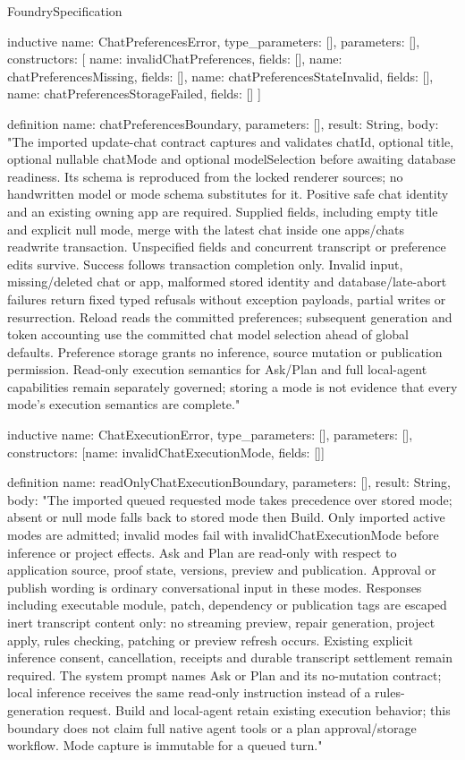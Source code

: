 \begin{lexlean}{FoundrySpecification}
\begin{semanticmodule}
inductive{
  name: ChatPreferencesError,
  type_parameters: [],
  parameters: [],
  constructors: [
    {name: invalidChatPreferences, fields: []},
    {name: chatPreferencesMissing, fields: []},
    {name: chatPreferencesStateInvalid, fields: []},
    {name: chatPreferencesStorageFailed, fields: []}
  ]
}

definition{
  name: chatPreferencesBoundary,
  parameters: [],
  result: String,
  body: "The imported update-chat contract captures and validates chatId, optional title, optional nullable chatMode and optional modelSelection before awaiting database readiness. Its schema is reproduced from the locked renderer sources; no handwritten model or mode schema substitutes for it. Positive safe chat identity and an existing owning app are required. Supplied fields, including empty title and explicit null mode, merge with the latest chat inside one apps/chats readwrite transaction. Unspecified fields and concurrent transcript or preference edits survive. Success follows transaction completion only. Invalid input, missing/deleted chat or app, malformed stored identity and database/late-abort failures return fixed typed refusals without exception payloads, partial writes or resurrection. Reload reads the committed preferences; subsequent generation and token accounting use the committed chat model selection ahead of global defaults. Preference storage grants no inference, source mutation or publication permission. Read-only execution semantics for Ask/Plan and full local-agent capabilities remain separately governed; storing a mode is not evidence that every mode's execution semantics are complete."
}

inductive{
  name: ChatExecutionError,
  type_parameters: [],
  parameters: [],
  constructors: [{name: invalidChatExecutionMode, fields: []}]
}

definition{
  name: readOnlyChatExecutionBoundary,
  parameters: [],
  result: String,
  body: "The imported queued requested mode takes precedence over stored mode; absent or null mode falls back to stored mode then Build. Only imported active modes are admitted; invalid modes fail with invalidChatExecutionMode before inference or project effects. Ask and Plan are read-only with respect to application source, proof state, versions, preview and publication. Approval or publish wording is ordinary conversational input in these modes. Responses including executable module, patch, dependency or publication tags are escaped inert transcript content only: no streaming preview, repair generation, project apply, rules checking, patching or preview refresh occurs. Existing explicit inference consent, cancellation, receipts and durable transcript settlement remain required. The system prompt names Ask or Plan and its no-mutation contract; local inference receives the same read-only instruction instead of a rules-generation request. Build and local-agent retain existing execution behavior; this boundary does not claim full native agent tools or a plan approval/storage workflow. Mode capture is immutable for a queued turn."
}


\end{semanticmodule}
\end{lexlean}
